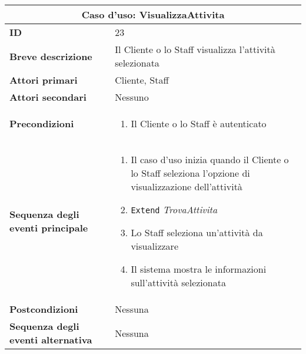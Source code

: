 \documentclass[a4paper]{report}
\begin{document}
\clearpage
\begin{table}[H]
\vspace*{-0cm}
\renewcommand{\arraystretch}{1.9}
\begin{tabular}{|p{3.9cm}|p{9.9cm}|}
\hline
\multicolumn{2}{|c|}{\textbf{Caso d’uso: VisualizzaAttivita}} \\ \hline
	\textbf{ID} & 23 \\ \hline
	\textbf{Breve descrizione} & Il Cliente o lo Staff visualizza l’attività selezionata \\ \hline
	\textbf{Attori primari} & Cliente, Staff \\ \hline
	\textbf{Attori secondari} & Nessuno \\ \hline
	\textbf{Precondizioni} & \begin{enumerate}[leftmargin=14pt,label=\arabic*.,labelsep=0.5em,topsep=0pt,partopsep=0pt,parsep=0pt,itemsep=0pt]
    \item Il Cliente o lo Staff è autenticato
\end{enumerate} \\ \hline
	\textbf{Sequenza degli eventi principale} & \begin{enumerate}[leftmargin=14pt,label=\arabic*.,labelsep=0.5em,topsep=0pt,partopsep=0pt,parsep=0pt,itemsep=0pt]
    \item Il caso d’uso inizia quando il Cliente o lo Staff seleziona l’opzione di visualizzazione  dell'attività
    \item \texttt{Extend} \textit{TrovaAttivita}
    \item Lo Staff seleziona un’attività da visualizzare
    \item Il sistema mostra le informazioni sull’attività selezionata
\end{enumerate} \\ \hline
	\textbf{Postcondizioni} & Nessuna \\ \hline
	\textbf{Sequenza degli eventi alternativa} & Nessuna \\ \hline
\end{tabular}
\end{table}
\end{document}
